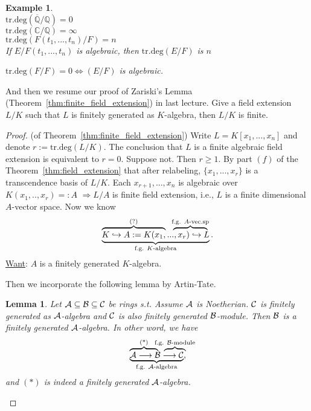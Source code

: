 \documentclass[11pt]{article}
\newtheorem{lemma}[thm]{Lemma}
\newtheorem{ex}[thm]{Example}
\newcommand{\cplx}{\mathbb C}
\newcommand{\ratl}{\mathbb Q}
\newcommand{\cala}{{\cal A}}
\newcommand{\calb}{{\cal B}}
\newcommand{\calc}{{\cal C}}
\newcommand{\Lrta}{\Longrightarrow}
\newcommand{\lrta}{\longrightarrow}
\newcommand{\Llrta}{\Longleftrightarrow}
\newcommand{\inj}{\hookrightarrow}
\begin{document}
\begin{ex}\ \\
$\text{tr.deg}(\overline{\ratl}/{\ratl})=0$\\
$\text{tr.deg}(\cplx/\ratl)=\infty$\\
$\text{tr.deg}(F(t_1,...,t_n)/F)=n$\\
If $E/F(t_1,...,t_n)$ is algebraic, then $\text{tr.deg}(E/F)$ is $n$

$\text{tr.deg}(F/F)=0\Llrta (E/F)$ is algebraic.
\end{ex}

And then we resume our proof of Zariski's Lemma (Theorem~\ref{thm:finite_field_extension}) in last lecture. Give a field extension $L/K$ such that $L$ is finitely generated as $K$-algebra, then $L/K$ is finite.
\begin{proof}(of Theorem~\ref{thm:finite_field_extension})
Write $L=K[ x_1,...,x_n]$ and denote
$r:=\text{tr.deg}(L/K). $ The  conclusion that $L$ is a finite algebraic field extension is equivalent to $ r=0$. Suppose not. Then $r\geq 1$. By part $(f)$ of the Theorem~\ref{thm:field_extension} that after relabeling,
$\{x_1,...,x_r\}$ is a transcendence basis of $L/K$. Each $x_{r+1},...,x_n$ is algebraic over $K(x_1,..,x_r)=:A$ $\Lrta L/A$ is finite field extension, i.e., $L$ is a finite dimensional $A$-vector space. Now we know
\[\underbrace{
      \mathrlap{\overbrace{\phantom{K\inj A:=K(x_1,}}^{\text{(?)}}}
      K\inj A:=K(x_1,..
      \mathrlap{\overbrace{\phantom{...,x_r)\inj  }}^{\text{f.g. $A$-vec.sp}}}
      .,x_r) \inj L
      }_{\text{f.g. $K$-algebra}}.
\]
\underline{Want}: $A$ is a finitely generated $K$-algebra.

Then we incorporate the following lemma by Artin-Tate.
\begin{lemma}\label{lem:Artin_Tate}
Let $\cala\subseteq\calb\subseteq\calc$ be rings s.t. Assume $\cala$ is Noetherian. $\calc$ is finitely generated as $\cala$-algebra and $\calc$ is also finitely generated $\calb$-module. Then $\calb$ is a finitely generated $\cala$-algebra. In other word, we have
\[\underbrace{
      \mathrlap{\overbrace{\phantom{\cala \lrta b }}^{\text{(*)}}}
      \cala\lrta 
      \mathrlap{\overbrace{\phantom{\calb\lrta   }}^{\text{f.g. $\calb$-module}}}
       \calb\lrta \calc
      }_{\text{f.g. $\cala$-algebra}},
\]
and $(*)$ is indeed a finitely generated $\cala$-algebra.



\end{lemma}
\end{proof}
\end{document}
